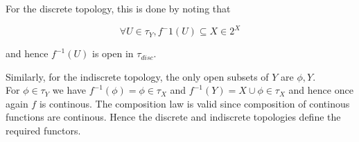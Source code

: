 \begin{frame}
    
 For the discrete topology, this is done by noting that 
 
 \begin{equation}
    \forall U \in \tau_Y , f^-1 (U) \subseteq X \in 2^X
 \end{equation}

    and hence \(f^{-1}(U)\) is open in \(\tau_{disc}\). 
    
  Similarly, for the indiscrete topology, the only open subsets of \(Y\) are
    \({\phi,Y}\).  \\ For \(\phi \in \tau_Y\) we have \(f^{-1}(\phi) = \phi \in
    \tau_X \) and \(f^{-1}(Y) = X \cup \phi \in \tau_X \)  %
and hence once again \(f\) is continous. The composition law is valid since
composition of continous functions are continous. Hence the discrete and
indiscrete topologies define the required functors. 

\end{frame}

